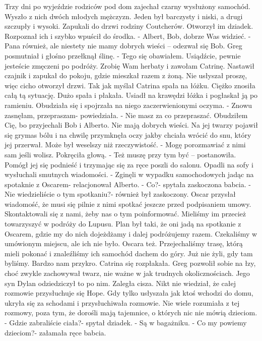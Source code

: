 \documentclass[12pt,a4paper]{book}
\begin{document}
Trzy dni po wyjeździe rodziców pod dom zajechał czarny wysłużony samochód. Wyszło z nich dwóch młodych mężczyzn. Jeden był barczysty i niski, a drugi szczupły i wysoki. Zapukali do drzwi rodziny Coutcherów. 
Otworzył im dziadek. Rozpoznał ich i szybko wpuścił do środka. 
- Albert, Bob, dobrze Was widzieć. 
- Pana również, ale niestety nie mamy dobrych wieści – odezwał się Bob. 
Greg posmutniał i głośno przełknął ślinę. 
- Tego się obawiałem. Usiądźcie, pewnie jesteście zmęczeni po podróży. Zrobię Wam herbaty i zawołam Catrinę. 
Nastawił czajnik i zapukał do pokoju, gdzie mieszkał razem z żoną. Nie usłyszał proszę, więc cicho otworzył drzwi. Tak jak myślał Catrina spała na łóżku. Ciężko znosiła całą tą sytuację. Dużo spała i płakała. 
Usiadł na krawędzi łóżka i pogłaskał ją po ramieniu. Obudziała się i spojrzała na niego zaczerwienionymi oczyma. 
- Znowu zasnęłam, przepraszam- powiedziała. 
- Nie masz za co przepraszać. Obudziłem Cię, bo przyjechali Bob i Alberto. Nie mają dobrych wieści. 
Na jej twarzy pojawił się grymas bólu i na chwilę przymknęła oczy jakby chciała wrócić do snu, który jej przerwał. Może był weselszy niż rzeczywistość. 
- Mogę porozmawiać z nimi sam jeśli wolisz. 
Pokręciła głową. 
- Też muszę przy tym być – postanowiła. 
Pomógł jej się podnieść i trzymając się za ręce poszli do salonu. Opadli na sofy i wysłuchali smutnych wiadomości. 
- Zginęli w wypadku samochodowych jadąc na spotaknie z Oscarem- relacjonował Alberto. 
- Co?- spytała zaskoczona babcia. 
- Nie wiedzieliście o tym spotkaniu?- również był zaskoczony.  Oscar przysłał wiadomość, że musi się pilnie z nimi spotkać jeszcze przed podpisaniem umowy. Skontaktowali się z nami, żeby nas o tym poinformować. Mieliśmy im przecież towarzyszyć w podróży do Lupusu. Plan był taki, że oni jadą na spotkanie z Oscarem, gdzie my do nich dojeżdżamy i dalej podróżujemy razem. Czekaliśmy w umówionym miejscu, ale ich nie było. Oscara też. Przejechaliśmy trasę, którą mieli pokonać i znaleźliśmy ich samochód dachem do góry. Już nie żyli, gdy tam byliśmy. Bardzo nam przykro. 
Catrina się rozpłakała. Greg pozwolił sobie na łzy, choć zwykle zachowywał twarz, nie ważne w jak trudnych okolicznościach. Jego syn Dylan odziedziczył to po nim. 
Zaległa cisza. 
Nikt nie wiedział, że całej rozmowie przysłuchuje się Hope. Gdy tylko usłyszała jak ktoś wchodzi do domu, ukryła się za schodami i przysłuchiwała rozmowie. Nie wiele rozumiała z tej rozmowy, poza tym, że dorośli mają tajemnice, o których nic nie mówią dzieciom. 
- Gdzie zabraliście ciała?- spytał dziadek.
- Są w bagażniku. 
- Co my powiemy dzieciom?- załamała ręce babcia. 
\end{document}
